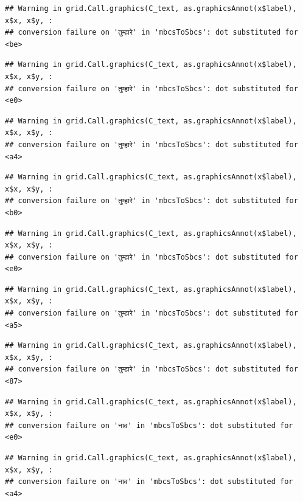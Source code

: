 \documentclass[
]{article}
\begin{document}
\begin{verbatim}
## Warning in grid.Call.graphics(C_text, as.graphicsAnnot(x$label), x$x, x$y, :
## conversion failure on 'तुम्हारे' in 'mbcsToSbcs': dot substituted for <be>
\end{verbatim}

\begin{verbatim}
## Warning in grid.Call.graphics(C_text, as.graphicsAnnot(x$label), x$x, x$y, :
## conversion failure on 'तुम्हारे' in 'mbcsToSbcs': dot substituted for <e0>
\end{verbatim}

\begin{verbatim}
## Warning in grid.Call.graphics(C_text, as.graphicsAnnot(x$label), x$x, x$y, :
## conversion failure on 'तुम्हारे' in 'mbcsToSbcs': dot substituted for <a4>
\end{verbatim}

\begin{verbatim}
## Warning in grid.Call.graphics(C_text, as.graphicsAnnot(x$label), x$x, x$y, :
## conversion failure on 'तुम्हारे' in 'mbcsToSbcs': dot substituted for <b0>
\end{verbatim}

\begin{verbatim}
## Warning in grid.Call.graphics(C_text, as.graphicsAnnot(x$label), x$x, x$y, :
## conversion failure on 'तुम्हारे' in 'mbcsToSbcs': dot substituted for <e0>
\end{verbatim}

\begin{verbatim}
## Warning in grid.Call.graphics(C_text, as.graphicsAnnot(x$label), x$x, x$y, :
## conversion failure on 'तुम्हारे' in 'mbcsToSbcs': dot substituted for <a5>
\end{verbatim}

\begin{verbatim}
## Warning in grid.Call.graphics(C_text, as.graphicsAnnot(x$label), x$x, x$y, :
## conversion failure on 'तुम्हारे' in 'mbcsToSbcs': dot substituted for <87>
\end{verbatim}

\begin{verbatim}
## Warning in grid.Call.graphics(C_text, as.graphicsAnnot(x$label), x$x, x$y, :
## conversion failure on 'नाव' in 'mbcsToSbcs': dot substituted for <e0>
\end{verbatim}

\begin{verbatim}
## Warning in grid.Call.graphics(C_text, as.graphicsAnnot(x$label), x$x, x$y, :
## conversion failure on 'नाव' in 'mbcsToSbcs': dot substituted for <a4>
\end{verbatim}
\end{document}
